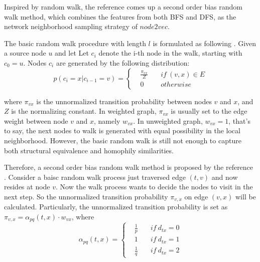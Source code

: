 \documentclass[sigconf]{acmart}
\begin{document}
Inspired by random walk, the reference \cite{node2vec} comes up a second order bias random walk method, which combines the features from both BFS and DFS, as the network neighborhood sampling strategy of $node2vec$.

The basic random walk procedure with length $l$ is formulated as following \cite{node2vec}. Given a source node $u$ and let Let $c_i$ denote the i-th node in the walk, starting with $c_0=u$. Nodes $c_i$ are generated by the following distribution: 
$$p(c_i=x|c_{i-1}=v)=\left\{
\begin{aligned}
&\frac{\pi_{vx}}{Z} \quad &if\ (v,x)\in E \\
&0 \quad &otherwise 
\end{aligned}
\right.$$

where $\pi_{vx}$ is the unnormalized transition probability between nodes $v$ and $x$, and $Z$ is the normalizing constant. In weighted graph, $\pi_{vx}$ is usually set to the edge weight between node $v$ and $x$, namely $w_{vx}$. In unweighted graph, $w_{vx}=1$, that's to say, the next nodes to walk is generated with equal possibility in the local neighborhood. However, the basic random walk is still not enough to capture both structural equivalence and homophily similarities. 

Therefore, a second order bias random walk method is proposed by the reference \cite{node2vec}. Consider a baisc random walk process just traversed edge $(t,v)$ and now resides at node $v$. Now the walk process wants to decide the nodes to visit in the next step. So the unnormalized transition probability $\pi_{v,x}$ on edge $(v,x)$ will be calculated. Particularly, the unnormalized transition probability is set as $\pi_{v,x}=\alpha_{pq}(t,x)\cdot w_{vx}$, where
$$\alpha_{pq}(t,x)=\left\{
\begin{aligned}
& \frac{1}{p} \quad &if \ d_{tx}=0\\
&  1          \quad &if \ d_{tx}=1\\
& \frac{1}{q} \quad &if \ d_{tx}=2
\end{aligned}
\right.$$
\end{document}
